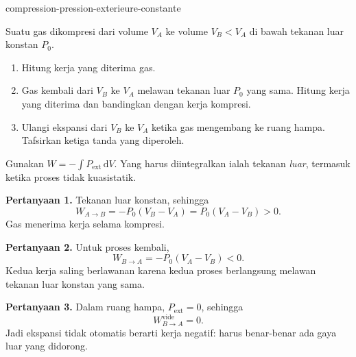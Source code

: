 \begin{exo}{compression-pression-exterieure-constante}

Suatu gas dikompresi dari volume $V_A$ ke volume $V_B<V_A$ di bawah tekanan
luar konstan $P_0$.

\begin{enumerate}
\item Hitung kerja yang diterima gas.
\item Gas kembali dari $V_B$ ke $V_A$ melawan tekanan luar $P_0$ yang sama. Hitung kerja yang diterima dan bandingkan dengan kerja kompresi.
\item Ulangi ekspansi dari $V_B$ ke $V_A$ ketika gas mengembang ke ruang hampa. Tafsirkan ketiga tanda yang diperoleh.
\end{enumerate}

\begin{indication}
Gunakan $W=-\int P_{\mathrm{ext}}\,\mathrm{d}V$. Yang harus diintegralkan ialah
tekanan \emph{luar}, termasuk ketika proses tidak kuasistatik.
\end{indication}

\begin{solution}
\textbf{Pertanyaan 1.} Tekanan luar konstan, sehingga
\[
W_{A\to B}=-P_0(V_B-V_A)=P_0(V_A-V_B)>0.
\]
Gas menerima kerja selama kompresi.

\textbf{Pertanyaan 2.} Untuk proses kembali,
\[
W_{B\to A}=-P_0(V_A-V_B)<0.
\]
Kedua kerja saling berlawanan karena kedua proses berlangsung melawan tekanan
luar konstan yang sama.

\textbf{Pertanyaan 3.} Dalam ruang hampa, $P_{\mathrm{ext}}=0$, sehingga
\[
W_{B\to A}^{\mathrm{vide}}=0.
\]
Jadi ekspansi tidak otomatis berarti kerja negatif: harus benar-benar ada
gaya luar yang didorong.
\end{solution}
\end{exo}
